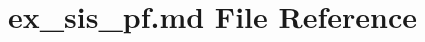 \hypertarget{ex__sis__pf_8md}{}\section{ex\+\_\+sis\+\_\+pf.\+md File Reference}
\label{ex__sis__pf_8md}
